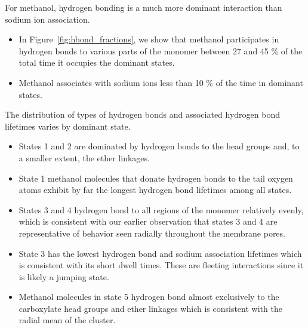 \documentclass[journal=jpcbfk,manuscript=article]{achemso}
\begin{document}
  For methanol, hydrogen bonding is a much more dominant interaction than sodium
  ion association. 
  \begin{itemize}
    \item In Figure~\ref{fig:hbond_fractions}, we show that methanol participates
    in hydrogen bonds to various parts of the monomer between 27 and 45 \% of the
    total time it occupies the dominant states.
    \item Methanol associates with sodium ions less than 10 \% of the time in 
    dominant states.
  \end{itemize}  
  
  The distribution of types of hydrogen bonds and associated hydrogen bond lifetimes
  varies by dominant state.
  \begin{itemize}
    \item States 1 and 2 are dominated by hydrogen bonds to the head groups and, to 
    a smaller extent, the ether linkages.
    \item State 1 methanol molecules that donate hydrogen bonds to the tail oxygen 
    atoms exhibit by far the longest hydrogen bond lifetimes among all states.
    \item States 3 and 4 hydrogen bond to all regions of the monomer relatively 
    evenly, which is consistent with our earlier observation that states 3 and 4
    are representative of behavior seen radially throughout the membrane pores.
    \item State 3 has the lowest hydrogen bond and sodium association lifetimes 
    which is consistent with its short dwell times. These are fleeting interactions
    since it is likely a jumping state.
    \item Methanol molecules in state 5 hydrogen bond almost exclusively to the 
    carboxylate head groups and ether linkages which is consistent with the radial
    mean of the cluster.
  \end{itemize}
  
\end{document}
